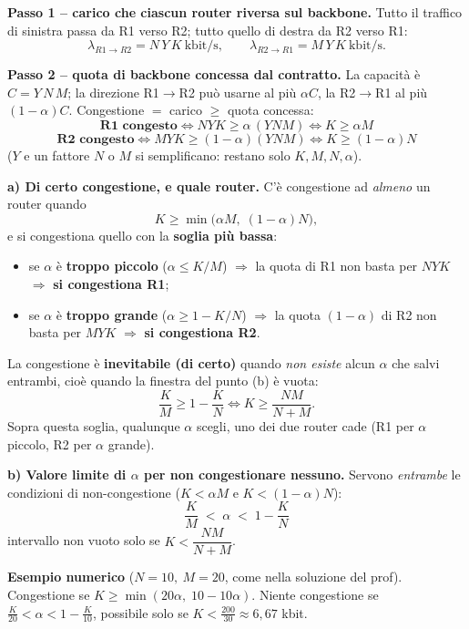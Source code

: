 \documentclass{report}
\begin{document}
\begin{solution}
\textbf{Passo 1 -- carico che ciascun router riversa sul backbone.} Tutto il
traffico di sinistra passa da R1 verso R2; tutto quello di destra da R2 verso R1:
\[
\lambda_{R1\to R2} = N\,Y\,K \ \text{kbit/s}, \qquad
\lambda_{R2\to R1} = M\,Y\,K \ \text{kbit/s}.
\]

\textbf{Passo 2 -- quota di backbone concessa dal contratto.} La capacità è
$C = Y\,N\,M$; la direzione R1$\to$R2 può usarne al più $\alpha C$, la R2$\to$R1 al
più $(1-\alpha)C$. Congestione $=$ carico $\ge$ quota concessa:
\[
\textbf{R1 congesto} \iff N Y K \ge \alpha\,(Y N M)
\iff \boxed{K \ge \alpha M}
\]
\[
\textbf{R2 congesto} \iff M Y K \ge (1-\alpha)(Y N M)
\iff \boxed{K \ge (1-\alpha)N}
\]
($Y$ e un fattore $N$ o $M$ si semplificano: restano solo $K,M,N,\alpha$).

\medskip
\noindent\textbf{a) Di certo congestione, e quale router.}
C'è congestione ad \emph{almeno} un router quando
\[
K \ge \min\big(\alpha M,\; (1-\alpha)N\big),
\]
e si congestiona quello con la \textbf{soglia più bassa}:
\begin{itemize}
\item se $\alpha$ è \textbf{troppo piccolo} ($\alpha \le K/M$) $\Rightarrow$ la quota
di R1 non basta per $NYK$ $\Rightarrow$ \textbf{si congestiona R1};
\item se $\alpha$ è \textbf{troppo grande} ($\alpha \ge 1-K/N$) $\Rightarrow$ la
quota $(1-\alpha)$ di R2 non basta per $MYK$ $\Rightarrow$ \textbf{si congestiona R2}.
\end{itemize}
La congestione è \textbf{inevitabile (di certo)} quando \emph{non esiste} alcun
$\alpha$ che salvi entrambi, cioè quando la finestra del punto (b) è vuota:
\[
\frac{K}{M} \ge 1-\frac{K}{N}
\iff K \ge \frac{N M}{N+M}.
\]
Sopra questa soglia, qualunque $\alpha$ scegli, uno dei due router cade (R1 per
$\alpha$ piccolo, R2 per $\alpha$ grande).

\medskip
\noindent\textbf{b) Valore limite di $\alpha$ per non congestionare nessuno.}
Servono \emph{entrambe} le condizioni di non-congestione ($K<\alpha M$ e
$K<(1-\alpha)N$):
\[
\boxed{\;\dfrac{K}{M} \;<\; \alpha \;<\; 1-\dfrac{K}{N}\;}
\]
intervallo non vuoto solo se $K < \dfrac{NM}{N+M}$.

\medskip
\noindent\textbf{Esempio numerico} ($N=10,\ M=20$, come nella soluzione del prof).
Congestione se $K \ge \min(20\alpha,\; 10-10\alpha)$. Niente congestione se
$\frac{K}{20} < \alpha < 1-\frac{K}{10}$, possibile solo se
$K < \frac{200}{30} \approx 6{,}67$ kbit.
\end{solution}
\end{document}
